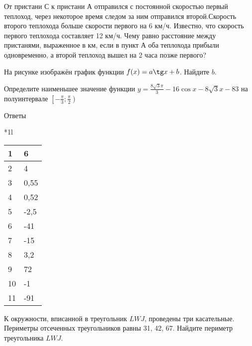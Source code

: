 \documentclass[twocolumn]{article}
\begin{document}
\begin{taskBN}{9}
От пристани С к пристани А  отправился с постоянной скоростью первый теплоход, через некоторое время следом за ним отправился второй.Скорость второго теплохода больше скорости первого на 6 км/ч. Известно, что скорость первого теплохода составляет 12 км/ч. Чему равно расстояние между пристанями, выраженное в км, если в пункт А оба теплохода прибыли одновременно, а второй теплоход вышел на 2 часа позже первого? 
\end{taskBN}

\begin{taskBN}{10}
На рисунке изображён график функции $f(x)=a\tg x+b$. Найдите $b$.\vspace{2.5cm}
\end{taskBN}

\begin{taskBN}{11}
Определите наименьшее значение функции $y =\frac{8\sqrt{3}\pi}{3}-16\cos x-8\sqrt{3}x-83$ на полуинтервале $\left[-\frac{\pi}{3};\frac{\pi}{2} \right)$
\end{taskBN}

\newpage
 Ответы


\begin{tabular}{*{1}l}
\begin{tabular}[t]{|l|l|}
\hline
1 & 6\\
\hline
2 & 4\\
\hline
3 & 0,55\\
\hline
4 & 0,52\\
\hline
5 & -2,5\\
\hline
6 & -41\\
\hline
7 & -15\\
\hline
8 & 3,2\\
\hline
9 & 72\\
\hline
10 & -1\\
\hline
11 & -91\\
\hline
\end{tabular}\end{tabular}



\newpage




\cleardoublepage
\def\examvart{Вариант 19.2}
\normalsize

\startpartone
\large




\begin{taskBN}{1}
К окружности, вписанной в треугольник $LWJ$, проведены три касательные. Периметры отсеченных треугольников равны 31, 42, 67. Найдите периметр треугольника $LWJ$.
\end{taskBN}
\end{document}
